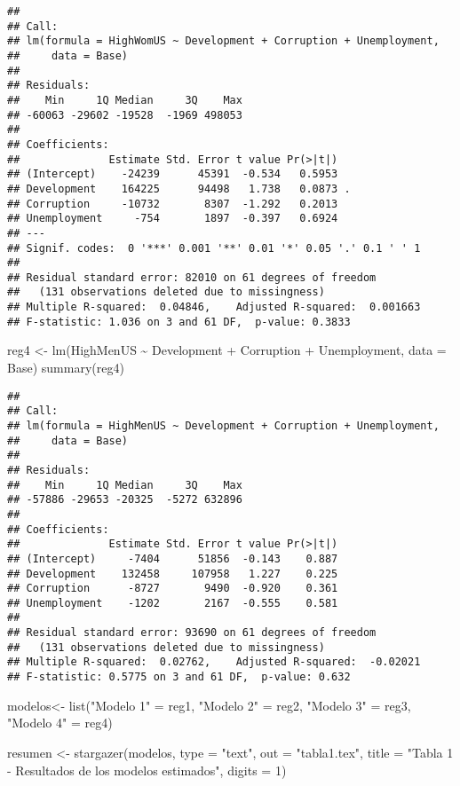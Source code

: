 \documentclass[
]{article}
\newenvironment{Shaded}{\begin{snugshade}}{\end{snugshade}}
\newcommand{\AttributeTok}[1]{\textcolor[rgb]{0.77,0.63,0.00}{#1}}
\newcommand{\DecValTok}[1]{\textcolor[rgb]{0.00,0.00,0.81}{#1}}
\newcommand{\FunctionTok}[1]{\textcolor[rgb]{0.00,0.00,0.00}{#1}}
\newcommand{\NormalTok}[1]{#1}
\newcommand{\OtherTok}[1]{\textcolor[rgb]{0.56,0.35,0.01}{#1}}
\newcommand{\SpecialCharTok}[1]{\textcolor[rgb]{0.00,0.00,0.00}{#1}}
\newcommand{\StringTok}[1]{\textcolor[rgb]{0.31,0.60,0.02}{#1}}
\begin{document}
\begin{verbatim}
## 
## Call:
## lm(formula = HighWomUS ~ Development + Corruption + Unemployment, 
##     data = Base)
## 
## Residuals:
##    Min     1Q Median     3Q    Max 
## -60063 -29602 -19528  -1969 498053 
## 
## Coefficients:
##              Estimate Std. Error t value Pr(>|t|)  
## (Intercept)    -24239      45391  -0.534   0.5953  
## Development    164225      94498   1.738   0.0873 .
## Corruption     -10732       8307  -1.292   0.2013  
## Unemployment     -754       1897  -0.397   0.6924  
## ---
## Signif. codes:  0 '***' 0.001 '**' 0.01 '*' 0.05 '.' 0.1 ' ' 1
## 
## Residual standard error: 82010 on 61 degrees of freedom
##   (131 observations deleted due to missingness)
## Multiple R-squared:  0.04846,    Adjusted R-squared:  0.001663 
## F-statistic: 1.036 on 3 and 61 DF,  p-value: 0.3833
\end{verbatim}

\begin{Shaded}
\begin{Highlighting}[]
\NormalTok{reg4 }\OtherTok{\textless{}{-}} \FunctionTok{lm}\NormalTok{(HighMenUS }\SpecialCharTok{\textasciitilde{}}\NormalTok{ Development }\SpecialCharTok{+}\NormalTok{ Corruption }\SpecialCharTok{+}\NormalTok{ Unemployment, }\AttributeTok{data =}\NormalTok{ Base)}
\FunctionTok{summary}\NormalTok{(reg4)}
\end{Highlighting}
\end{Shaded}

\begin{verbatim}
## 
## Call:
## lm(formula = HighMenUS ~ Development + Corruption + Unemployment, 
##     data = Base)
## 
## Residuals:
##    Min     1Q Median     3Q    Max 
## -57886 -29653 -20325  -5272 632896 
## 
## Coefficients:
##              Estimate Std. Error t value Pr(>|t|)
## (Intercept)     -7404      51856  -0.143    0.887
## Development    132458     107958   1.227    0.225
## Corruption      -8727       9490  -0.920    0.361
## Unemployment    -1202       2167  -0.555    0.581
## 
## Residual standard error: 93690 on 61 degrees of freedom
##   (131 observations deleted due to missingness)
## Multiple R-squared:  0.02762,    Adjusted R-squared:  -0.02021 
## F-statistic: 0.5775 on 3 and 61 DF,  p-value: 0.632
\end{verbatim}

\begin{Shaded}
\begin{Highlighting}[]
\NormalTok{modelos}\OtherTok{\textless{}{-}} \FunctionTok{list}\NormalTok{(}\StringTok{"Modelo 1"} \OtherTok{=}\NormalTok{ reg1, }\StringTok{"Modelo 2"} \OtherTok{=}\NormalTok{ reg2, }\StringTok{"Modelo 3"} \OtherTok{=}\NormalTok{ reg3, }\StringTok{"Modelo 4"} \OtherTok{=}\NormalTok{ reg4)}
 
\NormalTok{resumen }\OtherTok{\textless{}{-}} \FunctionTok{stargazer}\NormalTok{(modelos, }\AttributeTok{type =} \StringTok{"text"}\NormalTok{, }
          \AttributeTok{out =} \StringTok{"tabla1.tex"}\NormalTok{, }
          \AttributeTok{title =} \StringTok{"Tabla 1 {-} Resultados de los modelos estimados"}\NormalTok{,}
          \AttributeTok{digits =} \DecValTok{1}\NormalTok{)}
\end{Highlighting}
\end{Shaded}
\end{document}
